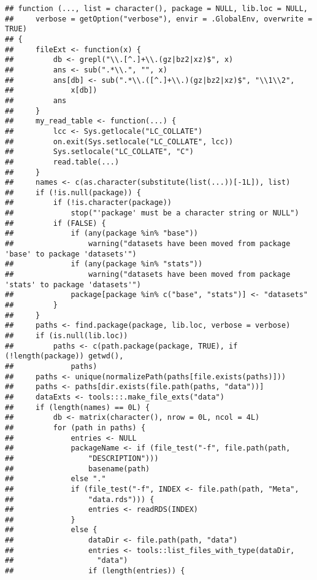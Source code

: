 \documentclass[
]{book}
\begin{document}
\begin{verbatim}
## function (..., list = character(), package = NULL, lib.loc = NULL, 
##     verbose = getOption("verbose"), envir = .GlobalEnv, overwrite = TRUE) 
## {
##     fileExt <- function(x) {
##         db <- grepl("\\.[^.]+\\.(gz|bz2|xz)$", x)
##         ans <- sub(".*\\.", "", x)
##         ans[db] <- sub(".*\\.([^.]+\\.)(gz|bz2|xz)$", "\\1\\2", 
##             x[db])
##         ans
##     }
##     my_read_table <- function(...) {
##         lcc <- Sys.getlocale("LC_COLLATE")
##         on.exit(Sys.setlocale("LC_COLLATE", lcc))
##         Sys.setlocale("LC_COLLATE", "C")
##         read.table(...)
##     }
##     names <- c(as.character(substitute(list(...))[-1L]), list)
##     if (!is.null(package)) {
##         if (!is.character(package)) 
##             stop("'package' must be a character string or NULL")
##         if (FALSE) {
##             if (any(package %in% "base")) 
##                 warning("datasets have been moved from package 'base' to package 'datasets'")
##             if (any(package %in% "stats")) 
##                 warning("datasets have been moved from package 'stats' to package 'datasets'")
##             package[package %in% c("base", "stats")] <- "datasets"
##         }
##     }
##     paths <- find.package(package, lib.loc, verbose = verbose)
##     if (is.null(lib.loc)) 
##         paths <- c(path.package(package, TRUE), if (!length(package)) getwd(), 
##             paths)
##     paths <- unique(normalizePath(paths[file.exists(paths)]))
##     paths <- paths[dir.exists(file.path(paths, "data"))]
##     dataExts <- tools:::.make_file_exts("data")
##     if (length(names) == 0L) {
##         db <- matrix(character(), nrow = 0L, ncol = 4L)
##         for (path in paths) {
##             entries <- NULL
##             packageName <- if (file_test("-f", file.path(path, 
##                 "DESCRIPTION"))) 
##                 basename(path)
##             else "."
##             if (file_test("-f", INDEX <- file.path(path, "Meta", 
##                 "data.rds"))) {
##                 entries <- readRDS(INDEX)
##             }
##             else {
##                 dataDir <- file.path(path, "data")
##                 entries <- tools::list_files_with_type(dataDir, 
##                   "data")
##                 if (length(entries)) {

\end{verbatim}
\end{document}
